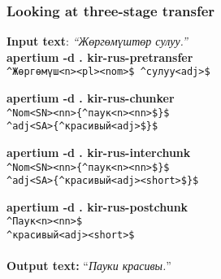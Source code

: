 \documentclass[10pt,xetex]{beamer} %
\begin{document}
\begin{frame}
\frametitle{Looking at three-stage transfer}

\textbf{Input text}: \emph{``Жөргөмүштөр сулуу.''}
\\[9pt]

\textbf{apertium -d . kir-rus-pretransfer}\\
\texttt{\^{}Жөргөмүш<n><pl><nom>\$ \^{}сулуу<adj>\$}
\newline

\textbf{apertium -d . kir-rus-chunker}\\
\texttt{\^{}Nom<SN>{\color{blue}{<m>}}<nn>{\color{red}{<pl>}}{\color{green}{<nom>}}\{\^{}паук<n>{\color{blue}{<2>}}<nn>{\color{red}{<4>}}{\color{green}{<5>}}\$\}\$\\
 \^{}adj<SA>{\color{blue}{<GD>}}{\color{red}{<ND>}}{\color{green}{<CD>}}\{\^{}красивый<adj>{\color{magenta}{<short>}}{\color{blue}{<2>}}{\color{red}{<3>}{\color{green}{<4>}}}\$\}\$}
\newline

\textbf{apertium -d . kir-rus-interchunk}\\
\texttt{\^{}Nom<SN>{\color{blue}{<m>}}<nn>{\color{red}{<pl>}}{\color{green}{<nom>}}\{\^{}паук<n>{\color{blue}{<2>}}<nn>{\color{red}{<4>}}{\color{green}{<5>}}\$\}\$\\
 \^{}adj<SA>{\color{blue}{<mfn>}}{\color{red}{<pl>}}{\color{green}{<nom>}}\{\^{}красивый<adj><short>{\color{blue}{<2>}}{\color{red}{<3>}{\color{green}{<4>}}}\$\}\$}
\newline

\textbf{apertium -d . kir-rus-postchunk}\\
\texttt{\^{}Паук<n>{\color{red}{<m>}}<nn>{\color{red}{<pl><nom>}}\$}\\
\texttt{\^{}красивый<adj><short>{\color{red}{<mfn><pl><nom>}}\$} \\
~\\
\textbf{Output text:} ``\emph{Пауки красивы.}'' %

\end{frame}





\end{document}
